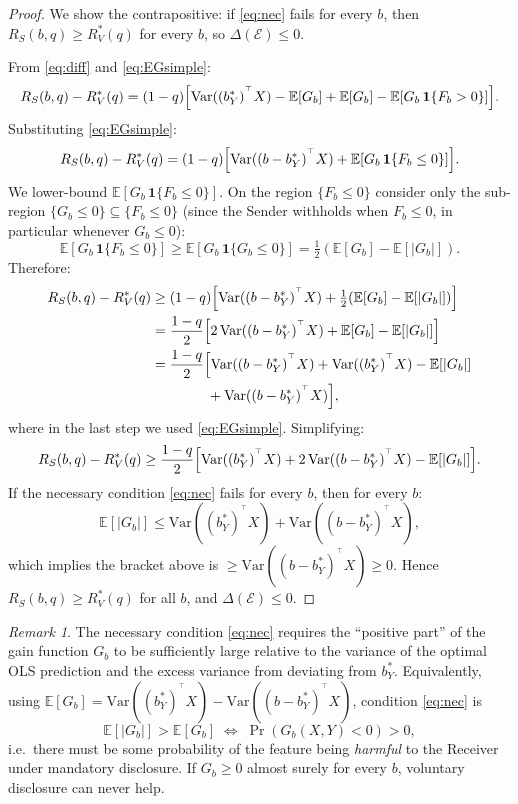 \documentclass[11pt]{article}
\theoremstyle{definition}
\theoremstyle{remark}
\newtheorem{remark}[theorem]{Remark}
\newcommand{\E}{\mathbb{E}}
\newcommand{\T}{^{\top}}
\begin{document}
\begin{proof}
We show the contrapositive: if \eqref{eq:nec} fails for every $b$, then
$R_{S}(b,q) \ge R_{V}^{*}(q)$ for every $b$, so $\Delta(\mathcal{E}) \le 0$.

From \eqref{eq:diff} and \eqref{eq:EGsimple}:
\begin{equation}\label{eq:exact}
  R_{S}(b,q) - R_{V}^{*}(q)
  = (1-q)\Bigl[\mathrm{Var}((b_{Y}^{*})^{\T}X)
               -\E[G_{b}]+\E[G_{b}]-\E[G_{b}\,\mathbf{1}\{F_{b}>0\}]\Bigr].
\end{equation}
Substituting \eqref{eq:EGsimple}:
\[
  R_{S}(b,q) - R_{V}^{*}(q)
  = (1-q)\Bigl[\mathrm{Var}((b-b_{Y}^{*})^{\T}X)
               + \E[G_{b}\,\mathbf{1}\{F_{b}\le 0\}]\Bigr].
\]
We lower-bound $\E[G_{b}\,\mathbf{1}\{F_{b}\le 0\}]$.
On the region $\{F_{b}\le 0\}$ consider only the sub-region $\{G_{b}\le 0\}
\subseteq\{F_{b}\le 0\}$ (since the Sender withholds when $F_{b}\le 0$, in particular
whenever $G_{b}\le 0$):
\[
  \E[G_{b}\,\mathbf{1}\{F_{b}\le 0\}]
  \ge \E[G_{b}\,\mathbf{1}\{G_{b}\le 0\}]
  = \tfrac{1}{2}(\E[G_{b}]-\E[|G_{b}|]).
\]
Therefore:
\begin{align}
  R_{S}(b,q) - R_{V}^{*}(q)
  &\ge (1-q)\Bigl[\mathrm{Var}((b-b_{Y}^{*})^{\T}X)
                 + \tfrac{1}{2}(\E[G_{b}]-\E[|G_{b}|])\Bigr] \notag\\
  &= \frac{1-q}{2}\Bigl[2\,\mathrm{Var}((b-b_{Y}^{*})^{\T}X)
                        + \E[G_{b}] - \E[|G_{b}|]\Bigr] \notag\\
  &= \frac{1-q}{2}\Bigl[\mathrm{Var}((b-b_{Y}^{*})^{\T}X)
                        + \mathrm{Var}((b_{Y}^{*})^{\T}X)
                        - \E[|G_{b}|] \notag\\
                       &\qquad\qquad
                        + \mathrm{Var}((b-b_{Y}^{*})^{\T}X)\Bigr], \label{eq:lb-nec}
\end{align}
where in the last step we used \eqref{eq:EGsimple}.
Simplifying:
\[
  R_{S}(b,q) - R_{V}^{*}(q)
  \ge \frac{1-q}{2}\Bigl[
    \mathrm{Var}((b_{Y}^{*})^{\T}X)
    + 2\,\mathrm{Var}((b-b_{Y}^{*})^{\T}X)
    - \E[|G_{b}|]
  \Bigr].
\]
If the necessary condition \eqref{eq:nec} fails for every $b$, then for every $b$:
\[
  \E[|G_{b}|] \le \mathrm{Var}((b_{Y}^{*})^{\T}X) + \mathrm{Var}((b-b_{Y}^{*})^{\T}X),
\]
which implies the bracket above is
$\ge \mathrm{Var}((b-b_{Y}^{*})^{\T}X)\ge 0$.
Hence $R_{S}(b,q)\ge R_{V}^{*}(q)$ for all $b$, and $\Delta(\mathcal{E})\le 0$.
\end{proof}

\begin{remark}
  The necessary condition \eqref{eq:nec} requires the ``positive part'' of the gain function
  $G_{b}$ to be sufficiently large relative to the variance of the optimal OLS prediction and
  the excess variance from deviating from $b_{Y}^{*}$.
  Equivalently, using $\E[G_{b}]=\mathrm{Var}((b_{Y}^{*})^{\T}X)-\mathrm{Var}((b-b_{Y}^{*})^{\T}X)$,
  condition \eqref{eq:nec} is
  \[
    \E[|G_{b}|] > \E[G_{b}]
    \;\iff\;
    \Pr(G_{b}(X,Y)<0) > 0,
  \]
  i.e.\ there must be some probability of the feature being \emph{harmful} to the Receiver
  under mandatory disclosure.  If $G_{b}\ge 0$ almost surely for every $b$, voluntary
  disclosure can never help.
\end{remark}
\end{document}

